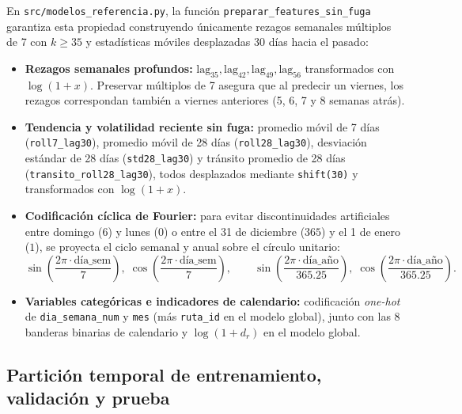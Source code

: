 \documentclass[11pt,a4paper]{article}
\begin{document}
En \texttt{src/modelos\_referencia.py}, la función \texttt{preparar\_features\_sin\_fuga} garantiza esta propiedad construyendo únicamente rezagos semanales múltiplos de 7 con $k \ge 35$ y estadísticas móviles desplazadas 30 días hacia el pasado:

\begin{itemize}[leftmargin=1.5em]
    \item \textbf{Rezagos semanales profundos:} $\text{lag}_{35}, \text{lag}_{42}, \text{lag}_{49}, \text{lag}_{56}$ transformados con $\log(1+x)$. Preservar múltiplos de 7 asegura que al predecir un viernes, los rezagos correspondan también a viernes anteriores (5, 6, 7 y 8 semanas atrás).
    \item \textbf{Tendencia y volatilidad reciente sin fuga:} promedio móvil de 7 días (\texttt{roll7\_lag30}), promedio móvil de 28 días (\texttt{roll28\_lag30}), desviación estándar de 28 días (\texttt{std28\_lag30}) y tránsito promedio de 28 días (\texttt{transito\_roll28\_lag30}), todos desplazados mediante \texttt{shift(30)} y transformados con $\log(1+x)$.
    \item \textbf{Codificación cíclica de Fourier:} para evitar discontinuidades artificiales entre domingo ($6$) y lunes ($0$) o entre el 31 de diciembre ($365$) y el 1 de enero ($1$), se proyecta el ciclo semanal y anual sobre el círculo unitario:
    \[
    \sin\!\left(\frac{2\pi \cdot \text{día\_sem}}{7}\right),\; \cos\!\left(\frac{2\pi \cdot \text{día\_sem}}{7}\right),\qquad
    \sin\!\left(\frac{2\pi \cdot \text{día\_año}}{365.25}\right),\; \cos\!\left(\frac{2\pi \cdot \text{día\_año}}{365.25}\right).
    \]
    \item \textbf{Variables categóricas e indicadores de calendario:} codificación \textit{one-hot} de \texttt{dia\_semana\_num} y \texttt{mes} (más \texttt{ruta\_id} en el modelo global), junto con las 8 banderas binarias de calendario y $\log(1 + d_r)$ en el modelo global.
\end{itemize}

\subsection{Partición temporal de entrenamiento, validación y prueba}
\end{document}
